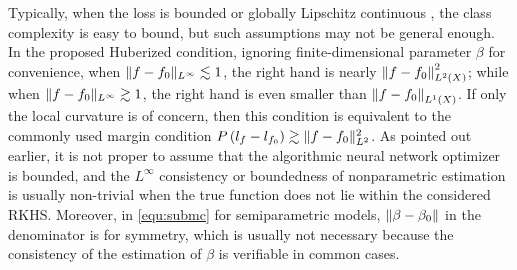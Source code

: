 









Typically, when the loss is bounded or globally Lipschitz continuous \citep[e.g.][]{ma2021statistical}, the class complexity is easy to bound, but such assumptions may not be general enough. 
In the proposed Huberized condition, ignoring finite-dimensional parameter $\beta$ for convenience, when $\| f-f_{0} \|_{L^\infty} \lesssim 1$, the right hand is nearly $\left\|f-f_{0}\right\|_{L^2(X)}^{2}$; while when $\| f-f_{0} \|_{L^\infty} \gtrsim 1$, the right hand is even smaller than $\left\|f-f_{0}\right\|_{L^1(X)}$. 
If only the local curvature is of concern, then this condition is equivalent to the commonly used margin condition  \( P\left(l_{f} - l_{f_{0}} \right) \gtrsim \| f - f_{0} \|_{L^2}^{2} \).
As pointed out earlier, it is not proper to assume that the algorithmic neural network optimizer is bounded, and the $L^{\infty}$ consistency or boundedness of nonparametric estimation is usually non-trivial when the true function does not lie within the considered RKHS. 
Moreover, in \eqref{equ:submc} for semiparametric models, $\left\|\beta-\beta_{0} \right\|$ in the denominator is for symmetry, which is usually not necessary because the consistency of the estimation of $\beta$ is verifiable in common cases. 

